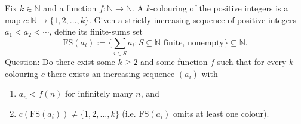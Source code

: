 Fix $k\in\mathbb{N}$ and a function $f:\mathbb{N}\to\mathbb{N}$.
A $k$-colouring of the positive integers is a map $c:\mathbb{N}\to\{1,2,\dots,k\}$.
Given a strictly increasing sequence of positive integers $a_1<a_2<\cdots$, define its finite-sums set
\[
\mathrm{FS}(a_i) := \Big\{\sum_{i\in S} a_i : S\subseteq \mathbb{N} \text{ finite, nonempty}\Big\} \subseteq \mathbb{N}.
\]
Question: Do there exist some $k\ge 2$ and some function $f$ such that for every $k$-colouring $c$ there exists an increasing sequence $(a_i)$ with
\begin{enumerate}
\item $a_n < f(n)$ for infinitely many $n$, and
\item $c(\mathrm{FS}(a_i))\ne \{1,2,\dots,k\}$ (i.e. $\mathrm{FS}(a_i)$ omits at least one colour).
\end{enumerate}
